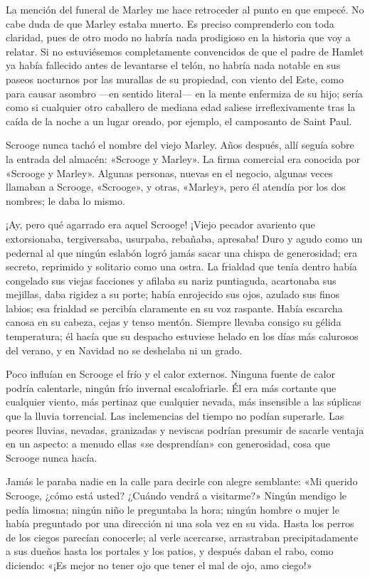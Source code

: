 \documentclass{novela}
\begin{document}
 La mención del funeral de Marley me hace retroceder al punto en que empecé. No cabe duda de que Marley estaba muerto. Es preciso comprenderlo con toda claridad, pues de otro modo no habría nada prodigioso en la historia que voy a relatar. Si no estuviésemos completamente convencidos de que el padre de Hamlet ya había fallecido antes de levantarse el telón, no habría nada notable en sus paseos nocturnos por las murallas de su propiedad, con viento del Este, como para causar asombro ---en sentido literal--- en la mente enfermiza de su hijo; sería como si cualquier otro caballero de mediana edad saliese irreflexivamente tras la caída de la noche a un lugar oreado, por ejemplo, el camposanto de Saint Paul.

 Scrooge nunca tachó el nombre del viejo Marley. Años después, allí seguía sobre la entrada del almacén: «Scrooge y Marley». La firma comercial era conocida por «Scrooge y Marley».  Algunas personas, nuevas en el negocio, algunas veces llamaban a Scrooge, «Scrooge», y otras, «Marley», pero él atendía por los dos nombres; le daba lo mismo.

 ¡Ay, pero qué agarrado era aquel Scrooge! ¡Viejo pecador avariento que extorsionaba, tergiversaba, usurpaba, rebañaba, apresaba! Duro y agudo como un pedernal al que ningún eslabón logró jamás sacar una chispa de generosidad; era secreto, reprimido y solitario como una ostra. La frialdad que tenía dentro había congelado sus viejas facciones y afilaba su nariz puntiaguda, acartonaba sus mejillas, daba rigidez a su porte; había enrojecido sus ojos, azulado sus finos labios; esa frialdad se percibía claramente en su voz raspante. Había escarcha canosa en su cabeza, cejas y tenso mentón. Siempre llevaba consigo su gélida temperatura; él hacía que su despacho estuviese helado en los días más calurosos del verano, y en Navidad no se deshelaba ni un grado.

 Poco influían en Scrooge el frío y el calor externos. Ninguna fuente de calor podría calentarle, ningún frío invernal escalofriarle. Él era más cortante que cualquier viento, más pertinaz que cualquier nevada, más insensible a las súplicas que la lluvia torrencial. Las inclemencias del tiempo no podían superarle. Las peores lluvias, nevadas, granizadas y neviscas podrían presumir de sacarle ventaja en un aspecto: a menudo ellas «se desprendían» con generosidad, cosa que Scrooge nunca hacía.

 Jamás le paraba nadie en la calle para decirle con alegre semblante: «Mi querido Scrooge, ¿cómo está usted? ¿Cuándo vendrá a visitarme?» Ningún mendigo le pedía limosna; ningún niño le preguntaba la hora; ningún hombre o mujer le había preguntado por una dirección ni una sola vez en su vida. Hasta los perros de los ciegos parecían conocerle; al verle acercarse, arrastraban precipitadamente a sus dueños hasta los portales y los patios, y después daban el rabo, como diciendo: «¡Es mejor no tener ojo que tener el mal de ojo, amo ciego!»
\end{document}

